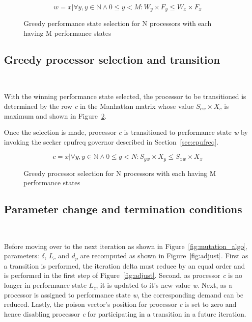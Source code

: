 \begin{figure}[h!]
\centering
\begin{equation*}
    w = {x | \forall y, y \in \mathbb{N} \wedge 0 \leq y < M : W_y \times F_y \leq W_x \times F_x}
\end{equation*}
\caption{Greedy performance state selection for N processors with each having M performance states}
\label{fig:winning_state}
\end{figure}

\subsection{Greedy processor selection and transition}~\label{sec:winner_proc}

With the winning performance state selected, the processor to be transitioned
is determined by the row \textit{c} in the Manhattan matrix whose value $S_{cw} \times X_c$ 
is maximum and shown in Figure~\ref{fig:winning_proc}. 

Once the selection is made, processor \textit{c} is transitioned to performance state
\textit{w} by invoking the seeker cpufreq governor described in Section~\ref{sec:cpufreq}.

\begin{figure}[h!]
\centering
\begin{equation*}
    c = {x | \forall y, y \in \mathbb{N} \wedge 0 \leq y < N : S_{yw} \times X_y \leq S_{xw} \times X_x}
\end{equation*}
\caption{Greedy processor selection for N processors with each having M performance states}
\label{fig:winning_proc}
\end{figure}

\subsection{Parameter change and termination conditions}~\label{sec:param_adjust}

Before moving over to the next iteration as shown in Figure~\ref{fig:mutation_algo},
parameters: $\delta$, $L_c$ and $d_p$ are recomputed
as shown in Figure~\ref{fig:adjust}. First as a transition is performed, the iteration delta
must reduce by an equal order and is performed in the first step of Figure~\ref{fig:adjust}.
Second, as processor \textit{c} is no longer in performance state $L_c$, it is updated to
it's new value \textit{w}. Next, as a processor is assigned to performance state \textit{w},
the corresponding demand can be reduced. Lastly, the poison vector's position for processor
\textit{c} is set to zero and hence disabling processor \textit{c} for participating in a transition in a future 
iteration.


